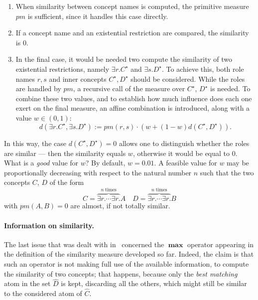 \begin{enumerate}
  \item When similarity between concept names is computed, the primitive measure \(pm\) is sufficient, since it handles this case directly.
  \item If a concept name and an existential restriction are compared, the similarity is \(0\).
  \item In the final case, it would be needed two compute the similarity of two existential restrictions, namely \(\exists{}r.C^\star{}\) and \(\exists{}s.D^\star{}\).
  To achieve this, both role names \(r,s\) and inner concepts \(C^\star,D^\star\) should be considered.
  While the roles are handled by \(pm\), a recursive call of the measure over \(C^\star\), \(D^\star\) is needed.
  To combine these two values, and to establish how much influence does each one exert on the final measure, an affine combination is introduced, along with a value \(w \in (0,1)\):
  \begin{equation*}
  d(\exists{}r.C^\star,\exists{}s.D^\star) :=
  pm(r,s) \cdot \left(w + (1-w)d(C^\star,D^\star)\right).
  \end{equation*}
\end{enumerate}
  In this way, the case \(d(C^\star,D^\star) = 0\) allows one to distinguish whether the roles are similar --- then the similarity equals \(w\), otherwise it would be equal to \(0\).
  What is a \emph{good} value for \(w\)? By default, \(w = 0.01\).
  A feasible value for \(w\) may be proportionally decreasing with respect to the natural number \(n\) such that the two concepts \(C\), \(D\) of the form
  \[
  C = \overbrace{\exists{}r.\dotsb{}\exists{}r.}^{n\;\text{times}}A \quad
  D = \overbrace{\exists{}r.\dotsb{}\exists{}r.}^{n\;\text{times}}B
  \]
  with \(pm(A,B) = 0\) are almost, if not totally similar.

  \paragraph{Information on similarity.}
  The last issue that was dealt with in~\cite{LeTu12} concerned the \(\mathbf{\max}\) operator appearing in the definition of the similarity measure developed so far.
  Indeed, the claim is that such an operator is not making full use of the available information, to compute the similarity of two concepts; that happens, because only the \emph{best matching} atom in the set \(\widehat{D}\) is kept, discarding all the others, which might still be similar to the considered atom of \(\widehat{C}\).


